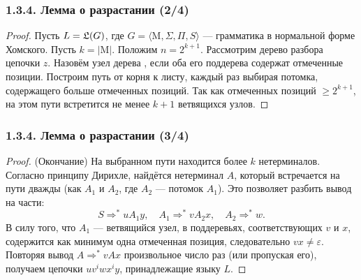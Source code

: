 \begin{frame}
\frametitle{1.3.4. Лемма о разрастании (2/4)}

\begin{proof}
Пусть $L=\frak{L}(G)$, где $G=\langle \mathrm{M}, \Sigma, \Pi, S\rangle$ — грамматика в нормальной форме Хомского. Пусть $k=|\mathrm{M}|$. Положим $n = 2^{k+1}$.
Рассмотрим дерево разбора цепочки $z$. Назовём узел дерева , если оба его поддерева содержат отмеченные позиции.
Построим путь от корня к листу, каждый раз выбирая потомка, содержащего больше отмеченных позиций.
Так как отмеченных позиций $\ge 2^{k+1}$, на этом пути встретится не менее $k+1$ ветвящихся узлов.
\end{proof}
\end{frame}

\begin{frame}
\frametitle{1.3.4. Лемма о разрастании (3/4)}

\begin{proof} (Окончание)
На выбранном пути находится более $k$ нетерминалов. \\Согласно принципу Дирихле, найдётся нетерминал $A$, который встречается на пути дважды (как $A_1$ и $A_2$, где $A_2$ — потомок $A_1$).
Это позволяет разбить вывод на части:
$$
S \Rightarrow^* u A_1 y, \quad A_1 \Rightarrow^* v A_2 x, \quad A_2 \Rightarrow^* w.
$$
В силу того, что $A_1$ — ветвящийся узел, в поддеревьях, соответствующих $v$ и $x$, содержится как минимум одна отмеченная позиция, следовательно $vx \neq \varepsilon$.
Повторяя вывод $A \Rightarrow^* v A x$ произвольное число раз (или пропуская его), получаем цепочки $u v^i w x^i y$, принадлежащие языку $L$.
\end{proof}
\end{frame}

